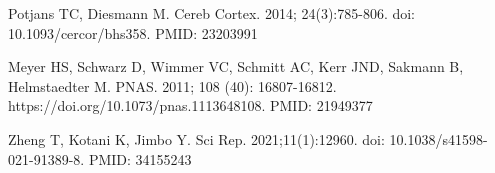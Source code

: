 \documentclass[10pt,letterpaper]{article}
\begin{document}
\begin{thebibliography}{10}
Potjans TC, Diesmann M.
\newblock Cereb Cortex. 2014; 24(3):785-806. doi: 10.1093/cercor/bhs358. PMID: 23203991

Meyer HS, Schwarz D, Wimmer VC, Schmitt AC, Kerr JND, Sakmann B, Helmstaedter M.
\newblock PNAS. 2011; 108 (40): 16807-16812. https://doi.org/10.1073/pnas.1113648108. PMID: 21949377

Zheng T, Kotani K, Jimbo Y.
\newblock Sci Rep. 2021;11(1):12960. doi: 10.1038/s41598-021-91389-8. PMID: 34155243

\end{thebibliography}
\end{document}
